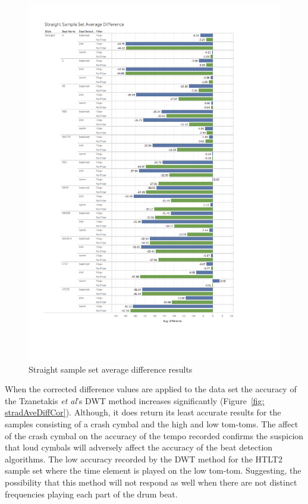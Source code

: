 \documentclass[a4paper, 11pt]{article}
\begin{document}
\begin{figure}[htbp]
\vspace{-1in}
\centering
\includegraphics[scale=0.38]{images/SSSAD.jpg}
\caption{Straight sample set average difference results}
\label{fig: stradAveDiff}
\end{figure}

When the corrected difference values are applied to the data set the accuracy of the Tzanetakis \textit{et al}'s \cite{tzane1} DWT method increases significantly (Figure~\ref{fig: stradAveDiffCor}). Although, it does return its least accurate results for the samples consisting of a crash cymbal and the high and low tom-toms. The affect of the crash cymbal on the accuracy of the tempo recorded confirms the suspicion that loud cymbals will adversely affect the accuracy of the beat detection algorithms. The low accuracy recorded by the DWT method for the HTLT2 sample set where the time element is played on the low tom-tom. Suggesting, the possibility that this method will not respond as well when there are not distinct frequencies playing each part of the drum beat. \par
\end{document}
